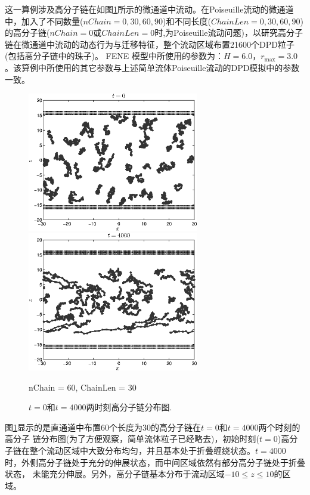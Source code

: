 \documentclass[twoside,12pt]{article}
\begin{document}
这一算例涉及高分子链在如图\ref{chain=}所示的微通道中流动。在Poiseuille流动的微通道中，加入了不同数量($nChain = 0,30,60,90$)和不同长度($ChainLen = 0,30,60,90$)的高分子链($nChain=0$或$ChainLen = 0$时,为Poiseuille流动问题)，以研究高分子链在微通道中流动的动态行为与迁移特征，整个流动区域布置21600个DPD粒子(包括高分子链中的珠子)。 FENE 模型中所使用的参数为：$H=6.0$，$r_{\mathrm{max}}=3.0$ 。该算例中所使用的其它参数与上述简单流体Poiseuille流动的DPD模拟中的参数一致。

\begin{figure}[!htb]
\centering
\begin{minipage}[c]{0.5\textwidth}
\centering
\includegraphics[width=7.5cm]{./figures/chain=0s.eps}
\end{minipage}%
\begin{minipage}[c]{0.5\textwidth}
\centering
\includegraphics[width=7.5cm]{./figures/chain=4000s.eps}
\end{minipage}
\small nChain = 60, ChainLen = 30\\
\caption{\label{chain=}\small $t=0$和$t=4000$两时刻高分子链分布图.}
\end{figure}

图\ref{chain=}显示的是直通道中布置60个长度为30的高分子链在$t=0$和$t=4000$两个时刻的高分子
链分布图(为了方便观察，简单流体粒子已经略去)，初始时刻($t=0$)高分子链在整个流动区域中大致分布均匀，并且基本处于折叠缠绕状态。$t=4000$ 时，外侧高分子链处于充分的伸展状态，而中间区域依然有部分高分子链处于折叠状态，
未能充分伸展。另外，高分子链基本分布于流动区域$-10\leq z \leq 10$的区域。
\end{document}
